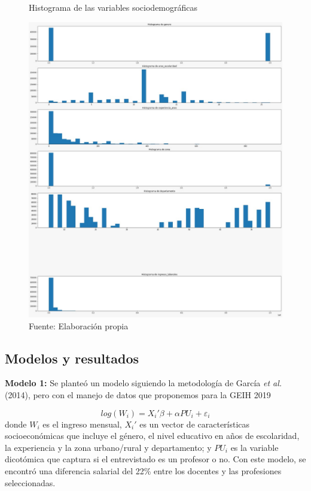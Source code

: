 \documentclass[a4paper]{article}
\begin{document}
\begin{figure}[htbp]
	\centering
	\caption{Histograma de las variables sociodemográficas}
	\includegraphics[width=1\linewidth, height=0.4\textheight]{fig1}
	\caption*{Fuente: Elaboración propia}
	\label{fig:fig1}
\end{figure}

   \subsection{Modelos y resultados}
\textbf{Modelo 1:} Se planteó un modelo siguiendo la metodología de García \textit{et al.} (2014), pero con el manejo de datos que proponemos para la GEIH 2019

\begin{equation}
log(W_{i})=X_{i}'\beta + \alpha PU_{i}+\varepsilon_{i}
\end{equation}
donde $W_i$ es el ingreso mensual, $X_{i}'$ es un vector de características socioeconómicas que incluye el género, el nivel educativo en años de escolaridad, la experiencia y la zona urbano/rural y departamento; y $PU_i$ es la variable dicotómica que captura si el entrevistado es un profesor o no. Con este modelo, se encontró una diferencia salarial del 22\% entre los docentes y las profesiones seleccionadas.\\
\end{document}
